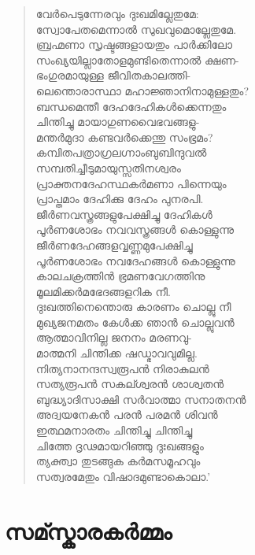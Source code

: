 \begin{verse}
വേര്‍പെടുന്നേരവും ദുഃഖമില്ലേതുമേ:\\
സ്വോപേതമെന്നാല്‍ സുഖവുമൊല്ലേതുമേ.\\
ബ്രഹ്മണാ സൃഷ്ടങ്ങളായതും പാര്‍ക്കിലോ\\
സംഖ്യയില്ലാതോളമുണ്ടിതെന്നാല്‍ ക്ഷണ-\\
ഭംഗുരമായുള്ള ജീവിതകാലത്തി-\\
ലെന്തൊരാസ്ഥാ മഹാജ്ഞാനിനാമുള്ളതും?\\
ബന്ധമെന്തീ ദേഹദേഹികള്‍ക്കെന്നതും\\
ചിന്തിച്ചു മായാഗുണവൈഭവങ്ങളു-\\
മന്തര്‍മുദാ കണ്ടവര്‍ക്കെന്തു സംഭ്രമം?\\
കമ്പിതപത്രാഗ്രലഗ്നാംബുബിന്ദുവല്‍\\
സമ്പതിച്ചീടുമായുസ്സതിനശ്വരം\\
പ്രാക്തനദേഹസ്ഥകര്‍മണാ പിന്നെയും\\
പ്രാപ്തമാം ദേഹിക്കു ദേഹം പുനരപി.\\
ജീര്‍ണവസ്ത്രങ്ങളുപേക്ഷിച്ചു ദേഹികള്‍\\
പൂര്‍ണശോഭം നവവസ്ത്രങ്ങള്‍ കൊള്ളുന്നു\\
ജീര്‍ണദേഹങ്ങളവ്വണ്ണമുപേക്ഷിച്ചു\\
പൂര്‍ണശോഭം നവദേഹങ്ങള്‍ കൊള്ളുന്നു\\
കാലചക്രത്തിന്‍ ഭ്രമണവേഗത്തിനു\\
മൂലമിക്കര്‍മഭേദങ്ങളറിക നീ.\\
ദുഃഖത്തിനെന്തൊരു കാരണം ചൊല്ലു നീ\\
മുഖ്യജനമതം കേള്‍ക്ക ഞാന്‍ ചൊല്ലുവന്‍\\
ആത്മാവിനില്ല ജനനം മരണവു-\\
മാത്മനി ചിന്തിക്ക ഷഡ്ഭാവവുമില്ല.\\
നിത്യനാനന്ദസ്വരൂപന്‍ നിരാകുലന്‍\\
സത്യരൂപന്‍ സകല്ശ്വരന്‍ ശാശ്വതന്‍\\
ബുദ്ധ്യാദിസാക്ഷി സര്‍വാത്മാ സനാതനന്‍\\
അദ്വയനേകന്‍ പരന്‍ പരമന്‍ ശിവന്‍\\
ഇത്ഥമനാരതം ചിന്തിച്ചു ചിന്തിച്ചു\\
ചിത്തേ ദൃഢമായറിഞ്ഞു ദുഃഖങ്ങളും\\
ത്യക്ത്വാ തുടങ്ങുക കര്‍മസമൂഹവും\\
സത്വരമേതും വിഷാദമുണ്ടാകൊലാ.’
\end{verse}


\section{സമ്സ്കാരകര്‍മ്മം}

